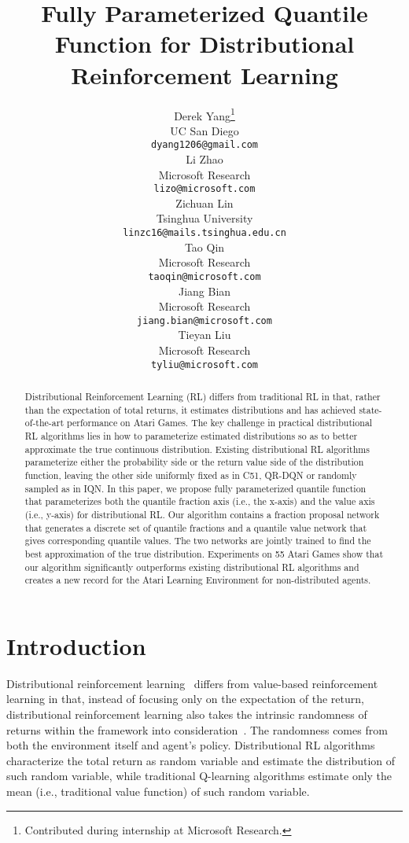 \documentclass{article}
\title{Fully Parameterized Quantile Function for Distributional Reinforcement Learning}
\author{
 Derek Yang\thanks{Contributed during internship at Microsoft Research.} \\
 UC San Diego\\
\texttt{dyang1206@gmail.com} \\
\And
Li Zhao \\
Microsoft Research \\
\texttt{lizo@microsoft.com} \\
\And
Zichuan Lin \\
Tsinghua University \\
\texttt{linzc16@mails.tsinghua.edu.cn} \\
\And
Tao Qin \\
Microsoft Research \\
\texttt{taoqin@microsoft.com} \\
\And
Jiang Bian \\
Microsoft Research \\
\texttt{jiang.bian@microsoft.com} \\
\And
Tieyan Liu \\
Microsoft Research \\
\texttt{tyliu@microsoft.com} \\
}
\begin{document}
\maketitle

\begin{abstract}
Distributional Reinforcement Learning (RL) differs from traditional RL in that, rather than the expectation of total returns, it estimates distributions and has achieved state-of-the-art performance on Atari Games. The key challenge in practical distributional RL algorithms lies in how to parameterize estimated distributions so as to better approximate the true continuous distribution. Existing distributional RL algorithms parameterize either the probability side or the return value side of the distribution function, leaving the other side uniformly fixed as in C51, QR-DQN or randomly sampled as in IQN. In this paper, we propose fully parameterized quantile function that parameterizes both the quantile fraction axis (i.e., the x-axis) and the value axis (i.e., y-axis) for distributional RL. Our algorithm contains a fraction proposal network that generates a discrete set of quantile fractions and a quantile value network that gives corresponding quantile values. The two networks are jointly trained to find the best approximation of the true distribution. Experiments on 55 Atari Games show that our algorithm significantly outperforms existing distributional RL algorithms and creates a new record for the Atari Learning Environment for non-distributed agents. 

\end{abstract}

\section{Introduction}
Distributional reinforcement learning~\citep{jaquette1973markov,sobel1982variance, white1988mean, morimura2010nonparametric, bellemare2017distributional} differs from value-based reinforcement learning in that, instead of focusing only on the expectation of the return, distributional reinforcement learning also takes the intrinsic randomness of returns within the framework into consideration~\citep{bellemare2017distributional,dabney2018distributional, dabney2018implicit, rowland2018analysis}. The randomness comes from both the environment itself and agent's policy. Distributional RL algorithms characterize the total return as random variable and estimate the distribution of such random variable, while traditional Q-learning algorithms estimate only the mean (i.e., traditional value function) of such random variable.
\end{document}
